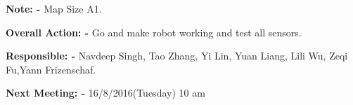 \documentclass[11pt]{article}
\begin{document}
 \begin{flushleft}

\textbf{Note: -} Map Size A1.

\end{flushleft}

 \begin{flushleft}

\textbf{Overall Action: -} Go and make robot working and test all sensors.

\end{flushleft}

 \begin{flushleft}

\textbf{Responsible: -}   Navdeep Singh, Tao Zhang, Yi Lin, Yuan Liang, Lili Wu, Zeqi Fu,Yann Frizenschaf.\end{flushleft}

 \begin{flushleft}

\textbf{Next Meeting: -} 16/8/2016(Tuesday) 10 am

\end{flushleft}
\end{document}
